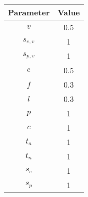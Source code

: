 \begin{tabular}[t]{cc}
\toprule
Parameter & Value \\
\midrule
$v$ & 0.5 \\
$s_{e,v}$ & 1 \\
$s_{p,v}$ & 1 \\
$e$     & 0.5 \\
$f$  & 0.3 \\
$l$  & 0.3 \\
$p$ & 1 \\
$c$ & 1 \\
$t_a$ & 1 \\
$t_n$ & 1 \\
$s_e$ & 1 \\
$s_p$ & 1 \\
\bottomrule
\end{tabular}%
